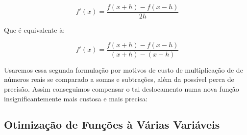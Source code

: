 \begin{equation}
    f'(x) = \frac{f(x + h) - f(x - h)}{2h}
\end{equation}

Que é equivalente à:

\begin{equation}
    f'(x) = \frac{f(x + h) - f(x - h)}{(x + h) - (x - h)}
\end{equation}


Usaremos essa segunda formulação por motivos de custo de multiplicação de de
números reais se comparado a somas e subtrações, além da possível perca de
precisão. Assim conseguimos compensar o tal deslocamento numa nova função
insignificantemente mais custosa e mais precisa:








\textcolor[rgb]{1,0,0}{\section{{Otimização de Funções à Várias Variáveis}}}

\hspace{0.8cm}





%
